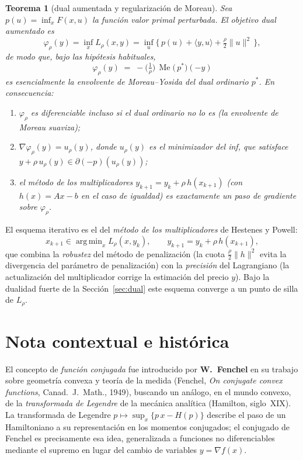 \documentclass[12pt]{book}
\newcommand{\subdiff}{\partial}
\DeclareMathOperator*{\argmin}{arg\,min}
\DeclareMathOperator{\Moreau}{Me}
\theoremstyle{definition}
\theoremstyle{plain}
\newtheorem{teorema}{Teorema}[section]
\theoremstyle{remark}
\begin{document}
\begin{teorema}[dual aumentada y regularización de Moreau]
  Sea $p(u)=\inf_x F(x,u)$ la \emph{función valor} primal
  perturbada.  El objetivo dual aumentado es
  \[
    \varphi_\rho(y)=\inf_x L_\rho(x,y)
    =\inf_{u}\bigl\{\, p(u)+\langle y,u\rangle+\tfrac{\rho}{2}\|u\|^2\,\bigr\},
  \]
  de modo que, bajo las hipótesis habituales,
  \[
    \boxed{\;
    \varphi_\rho(y)
    \;=\; -\bigl(\tfrac{1}{\rho}\bigr)\,
          \Moreau\!\bigl(\,p^*\bigr)(-y)
    \;}
  \]
  es esencialmente la \emph{envolvente de Moreau--Yosida} del dual
  ordinario $p^*$.  En consecuencia:
  \begin{enumerate}[leftmargin=1.4em,itemsep=2pt]
    \item $\varphi_\rho$ es \emph{diferenciable} incluso si el dual
          ordinario no lo es (la envolvente de Moreau suaviza);
    \item $\nabla\varphi_\rho(y)=u_\rho(y)$, donde $u_\rho(y)$ es el
          minimizador del inf, que satisface
          $y+\rho\, u_\rho(y)\in\subdiff(-p)(u_\rho(y))$;
    \item el método de los multiplicadores
          $y_{k+1}=y_k+\rho\, h(x_{k+1})$ (con $h(x)=Ax-b$ en el caso
          de igualdad) es exactamente un \emph{paso de gradiente} sobre
          $\varphi_\rho$.
  \end{enumerate}
\end{teorema}

El esquema iterativo es el del \emph{método de los
multiplicadores} de Hestenes y Powell:
\[
  x_{k+1}\in\argmin_x L_\rho(x,y_k),
  \qquad
  y_{k+1}=y_k+\rho\, h(x_{k+1}),
\]
que combina la \emph{robustez} del método de penalización (la
cuota $\tfrac{\rho}{2}\|h\|^2$ evita la divergencia del parámetro
de penalización) con la \emph{precisión} del Lagrangiano (la
actualización del multiplicador corrige la estimación del
precio $y$).  Bajo la dualidad fuerte de la Sección~\ref{sec:dual}
este esquema converge a un punto de silla de $L_\rho$.

\section{Nota contextual e histórica}\label{sec:contexto}

El concepto de \emph{función conjugada} fue introducido por
\textbf{W.~Fenchel} en su trabajo sobre geometría convexa y
teoría de la medida (Fenchel, \textit{On conjugate convex
functions}, Canad.\ J.\ Math., 1949), buscando un análogo, en el
mundo convexo, de la \emph{transformada de Legendre} de la
mecánica analítica (Hamilton, siglo~XIX).  La transformada de
Legendre $p\mapsto \sup_x\{p\,x-H(p)\}$ describe el paso de un
Hamiltoniano a su representación en los momentos conjugados; el
conjugado de Fenchel es precisamente esa idea, generalizada a
funciones no diferenciables mediante el supremo en lugar del
cambio de variables $y=\nabla f(x)$.
\end{document}
